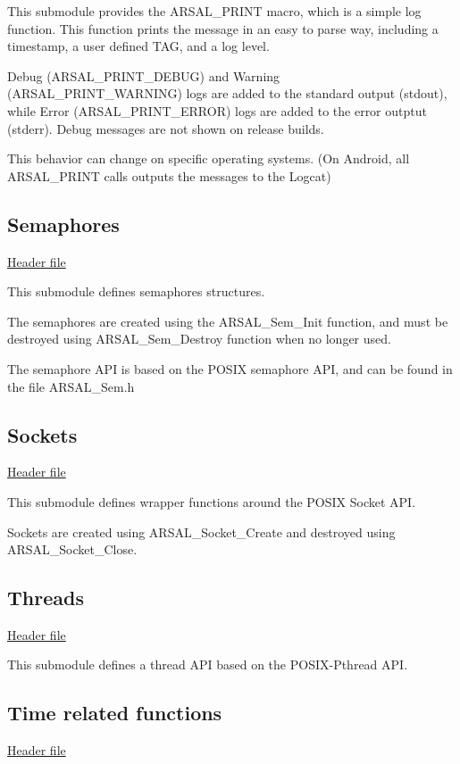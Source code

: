 This submodule provides the A\+R\+S\+A\+L\+\_\+\+P\+R\+I\+NT macro, which is a simple log function. This function prints the message in an easy to parse way, including a timestamp, a user defined T\+AG, and a log level.

Debug (A\+R\+S\+A\+L\+\_\+\+P\+R\+I\+N\+T\+\_\+\+D\+E\+B\+UG) and Warning (A\+R\+S\+A\+L\+\_\+\+P\+R\+I\+N\+T\+\_\+\+W\+A\+R\+N\+I\+NG) logs are added to the standard output (stdout), while Error (A\+R\+S\+A\+L\+\_\+\+P\+R\+I\+N\+T\+\_\+\+E\+R\+R\+OR) logs are added to the error outptut (stderr). Debug messages are not shown on release builds.

This behavior can change on specific operating systems. (On Android, all A\+R\+S\+A\+L\+\_\+\+P\+R\+I\+NT calls outputs the messages to the Logcat)\hypertarget{index_SAL_sem_subsec}{}\subsection{Semaphores}\label{index_SAL_sem_subsec}
\hyperlink{}{Header file }

This submodule defines semaphores structures.

The semaphores are created using the A\+R\+S\+A\+L\+\_\+\+Sem\+\_\+\+Init function, and must be destroyed using A\+R\+S\+A\+L\+\_\+\+Sem\+\_\+\+Destroy function when no longer used.

The semaphore A\+PI is based on the P\+O\+S\+IX semaphore A\+PI, and can be found in the file A\+R\+S\+A\+L\+\_\+\+Sem.\+h\hypertarget{index_SAL_socket_subsec}{}\subsection{Sockets}\label{index_SAL_socket_subsec}
\hyperlink{}{Header file }

This submodule defines wrapper functions around the P\+O\+S\+IX Socket A\+PI.

Sockets are created using A\+R\+S\+A\+L\+\_\+\+Socket\+\_\+\+Create and destroyed using A\+R\+S\+A\+L\+\_\+\+Socket\+\_\+\+Close.\hypertarget{index_SAL_thread_subsec}{}\subsection{Threads}\label{index_SAL_thread_subsec}
\hyperlink{}{Header file }

This submodule defines a thread A\+PI based on the P\+O\+S\+I\+X-\/\+Pthread A\+PI.\hypertarget{index_SAL_time_subsec}{}\subsection{Time related functions}\label{index_SAL_time_subsec}
\hyperlink{}{Header file }

